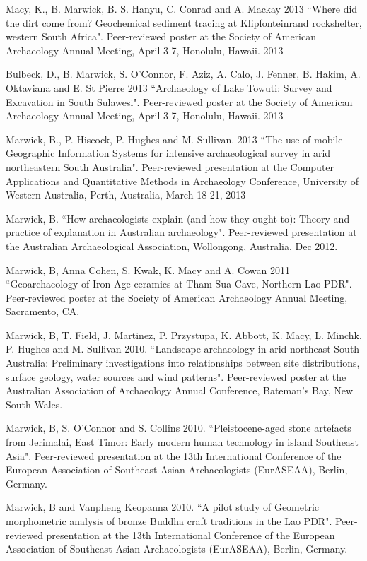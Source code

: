 \ind Macy, K., B. Marwick, B. S. Hanyu, C. Conrad and A. Mackay 2013 ``Where did the dirt come from? Geochemical sediment tracing at Klipfonteinrand rockshelter, western South Africa". Peer-reviewed poster at the Society of American Archaeology Annual Meeting, April 3-7, Honolulu, Hawaii. 2013

\ind Bulbeck, D., B. Marwick, S. O'Connor, F. Aziz, A. Calo, J. Fenner, B. Hakim, A. Oktaviana and E. St Pierre 2013 ``Archaeology of Lake Towuti: Survey and Excavation in South Sulawesi". Peer-reviewed poster at the Society of American Archaeology Annual Meeting, April 3-7, Honolulu, Hawaii. 2013

\ind Marwick, B., P. Hiscock, P. Hughes and M. Sullivan. 2013 ``The use of mobile Geographic Information Systems for intensive archaeological survey in arid northeastern South Australia". Peer-reviewed presentation at the Computer Applications and Quantitative Methods in Archaeology Conference, University of Western Australia, Perth, Australia, March 18-21, 2013

\ind Marwick, B. ``How archaeologists explain (and how they ought to): Theory and practice of explanation in Australian archaeology". Peer-reviewed presentation at the Australian Archaeological Association, Wollongong, Australia, Dec 2012.

\ind Marwick, B, Anna Cohen, S. Kwak, K. Macy and A. Cowan 2011 ``Geoarchaeology of Iron Age ceramics at Tham Sua Cave, Northern Lao PDR". Peer-reviewed poster at the Society of American Archaeology Annual Meeting, Sacramento, CA.

\ind Marwick, B, T. Field, J. Martinez, P. Przystupa, K. Abbott, K. Macy, L. Minchk, P. Hughes and M. Sullivan 2010. ``Landscape archaeology in arid northeast South Australia: Preliminary investigations into relationships between site distributions, surface geology, water sources and wind patterns". Peer-reviewed poster at the Australian Association of Archaeology Annual Conference, Bateman’s Bay, New South Wales.

\ind Marwick, B, S. O’Connor and S. Collins 2010. ``Pleistocene-aged stone artefacts from Jerimalai, East Timor: Early modern human technology in island Southeast Asia". Peer-reviewed presentation at the 13th International Conference of the European Association of Southeast Asian Archaeologists (EurASEAA), Berlin, Germany.

\ind Marwick, B and Vanpheng Keopanna 2010. ``A pilot study of Geometric morphometric analysis of bronze Buddha craft traditions in the Lao PDR". Peer-reviewed presentation  at the 13th International Conference of the European Association of Southeast Asian Archaeologists (EurASEAA), Berlin, Germany.

